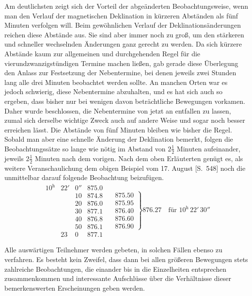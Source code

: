 Am deutlichsten zeigt sich der Vorteil der abgeänderten Beobachtungsweise, wenn man den Verlauf der magnetischen Deklination in kürzeren Abständen als fünf Minuten verfolgen will. Beim gewöhnlichen Verlauf der Deklinationsänderungen reichen diese Abstände aus. Sie sind aber immer noch zu groß, um den stärkeren und schneller wechselnden Änderungen ganz gerecht zu werden. Da sich kürzere Abstände kaum zur allgemeinen und durchgehenden Regel für die vierundzwanzigstündigen Termine machen ließen, gab gerade diese Überlegung den Anlass zur Festsetzung der Nebentermine, bei denen jeweils zwei Stunden lang alle drei Minuten beobachtet werden sollte. An manchen Orten war es jedoch schwierig, diese Nebentermine abzuhalten, und es hat sich auch so ergeben, dass bisher nur bei wenigen davon beträchtliche Bewegungen vorkamen. Daher wurde beschlossen, die Nebentermine von jetzt an entfallen zu lassen, zumal sich derselbe wichtige Zweck auch auf andere Weise und sogar noch besser erreichen lässt. Die Abstände von fünf Minuten bleiben wie bisher die Regel. Sobald man aber eine schnelle Änderung der Deklination bemerkt, folgen die Beobachtungssätze so lange wie nötig im Abstand von $2\frac12$ Minuten aufeinander, jeweils $2\frac12$ Minuten nach dem vorigen. Nach dem oben Erläuterten genügt es, als weitere Veranschaulichung dem obigen Beispiel vom 17. August [S.\ 548] noch die unmittelbar darauf folgende Beobachtung beizufügen.
\[
\begin{array}{rrr|r|}
10^{\mathrm h}&22'&0''&875.0\\
&&10&874.8\\
&&20&876.0\\
&&30&877.1\\
&&40&876.8\\
&&50&876.1\\
&23&0&877.1
\end{array}\quad
\left.\begin{array}{r}875.50\\875.95\\876.40\\876.60\\876.90\end{array}\right\}876.27\quad\text{für }10^{\mathrm h}\,22'\,30''
\]

Alle auswärtigen Teilnehmer werden gebeten, in solchen Fällen ebenso zu verfahren. Es besteht kein Zweifel, dass dann bei allen größeren Bewegungen stets zahlreiche Beobachtungen, die einander bis in die Einzelheiten entsprechen zusammenkommen und interessante Aufschlüsse über die Verhältnisse dieser bemerkenswerten Erscheinungen geben werden.

